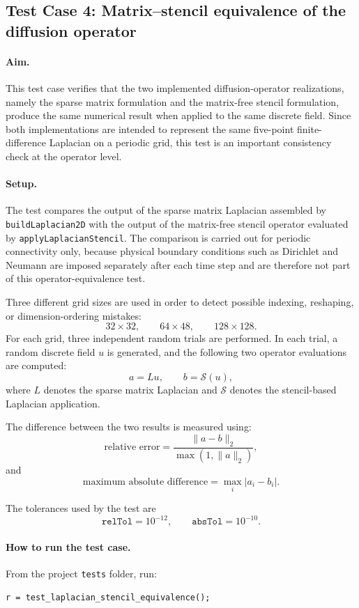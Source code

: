 \subsection{Test Case 4: Matrix--stencil equivalence of the diffusion operator}
\label{sec:verification_testcase_laplacian_equivalence}

\paragraph{Aim.}
This test case verifies that the two implemented diffusion-operator realizations, namely the sparse matrix formulation and the matrix-free stencil formulation, produce the same numerical result when applied to the same discrete field. Since both implementations are intended to represent the same five-point finite-difference Laplacian on a periodic grid, this test is an important consistency check at the operator level.

\paragraph{Setup.}
The test compares the output of the sparse matrix Laplacian assembled by \texttt{buildLaplacian2D} with the output of the matrix-free stencil operator evaluated by \texttt{applyLaplacianStencil}. The comparison is carried out for periodic connectivity only, because physical boundary conditions such as Dirichlet and Neumann are imposed separately after each time step and are therefore not part of this operator-equivalence test.

Three different grid sizes are used in order to detect possible indexing, reshaping, or dimension-ordering mistakes:
\[
32\times 32,\qquad 64\times 48,\qquad 128\times 128.
\]
For each grid, three independent random trials are performed. In each trial, a random discrete field \(u\) is generated, and the following two operator evaluations are computed:
\[
a = Lu,
\qquad
b = \mathcal{S}(u),
\]
where \(L\) denotes the sparse matrix Laplacian and \(\mathcal{S}\) denotes the stencil-based Laplacian application.

The difference between the two results is measured using:
\[
\text{relative error} = \frac{\|a-b\|_2}{\max(1,\|a\|_2)},
\]
and
\[
\text{maximum absolute difference} = \max_i |a_i-b_i|.
\]

The tolerances used by the test are
\[
\texttt{relTol} = 10^{-12},
\qquad
\texttt{absTol} = 10^{-10}.
\]

\paragraph{How to run the test case.}
From the project \texttt{tests} folder, run:
\begin{verbatim}
r = test_laplacian_stencil_equivalence();
\end{verbatim}

